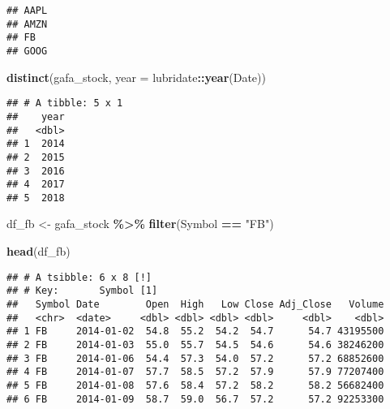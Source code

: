 \documentclass[
]{article}
\newenvironment{Shaded}{\begin{snugshade}}{\end{snugshade}}
\newcommand{\AttributeTok}[1]{\textcolor[rgb]{0.13,0.29,0.53}{#1}}
\newcommand{\CommentTok}[1]{\textcolor[rgb]{0.56,0.35,0.01}{\textit{#1}}}
\newcommand{\ConstantTok}[1]{\textcolor[rgb]{0.56,0.35,0.01}{#1}}
\newcommand{\FunctionTok}[1]{\textcolor[rgb]{0.13,0.29,0.53}{\textbf{#1}}}
\newcommand{\NormalTok}[1]{#1}
\newcommand{\OtherTok}[1]{\textcolor[rgb]{0.56,0.35,0.01}{#1}}
\newcommand{\SpecialCharTok}[1]{\textcolor[rgb]{0.81,0.36,0.00}{\textbf{#1}}}
\newcommand{\StringTok}[1]{\textcolor[rgb]{0.31,0.60,0.02}{#1}}
\begin{document}
\begin{verbatim}
## AAPL
## AMZN
## FB
## GOOG
\end{verbatim}

\begin{Shaded}
\begin{Highlighting}[]
\FunctionTok{distinct}\NormalTok{(gafa\_stock, }\AttributeTok{year =}\NormalTok{ lubridate}\SpecialCharTok{::}\FunctionTok{year}\NormalTok{(Date))}
\end{Highlighting}
\end{Shaded}

\begin{verbatim}
## # A tibble: 5 x 1
##    year
##   <dbl>
## 1  2014
## 2  2015
## 3  2016
## 4  2017
## 5  2018
\end{verbatim}

\begin{Shaded}
\begin{Highlighting}[]
\NormalTok{df\_fb }\OtherTok{\textless{}{-}}\NormalTok{ gafa\_stock }\SpecialCharTok{\%\textgreater{}\%}
  \FunctionTok{filter}\NormalTok{(Symbol }\SpecialCharTok{==} \StringTok{"FB"}\NormalTok{)}

\FunctionTok{head}\NormalTok{(df\_fb)}
\end{Highlighting}
\end{Shaded}

\begin{verbatim}
## # A tsibble: 6 x 8 [!]
## # Key:       Symbol [1]
##   Symbol Date        Open  High   Low Close Adj_Close   Volume
##   <chr>  <date>     <dbl> <dbl> <dbl> <dbl>     <dbl>    <dbl>
## 1 FB     2014-01-02  54.8  55.2  54.2  54.7      54.7 43195500
## 2 FB     2014-01-03  55.0  55.7  54.5  54.6      54.6 38246200
## 3 FB     2014-01-06  54.4  57.3  54.0  57.2      57.2 68852600
## 4 FB     2014-01-07  57.7  58.5  57.2  57.9      57.9 77207400
## 5 FB     2014-01-08  57.6  58.4  57.2  58.2      58.2 56682400
## 6 FB     2014-01-09  58.7  59.0  56.7  57.2      57.2 92253300
\end{verbatim}

\begin{Shaded}
\end{Shaded}
\end{document}
